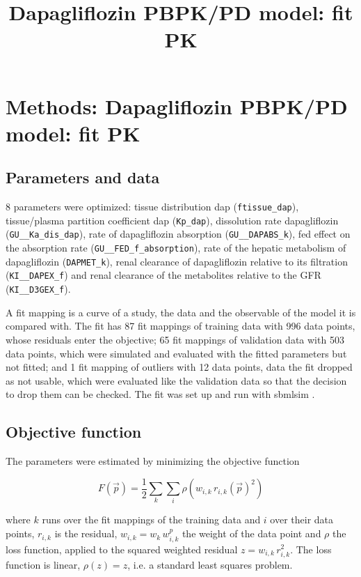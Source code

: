 \documentclass{article}
\title{Dapagliflozin PBPK/PD model: fit PK}
\date{}
\begin{document}
\maketitle

\section{Methods: Dapagliflozin PBPK/PD model: fit PK}

\subsection{Parameters and data}

8 parameters were optimized: tissue distribution dap (\texttt{ftissue\_dap}), tissue/plasma partition coefficient dap (\texttt{Kp\_dap}), dissolution rate dapagliflozin (\texttt{GU\_\_Ka\_dis\_dap}), rate of dapagliflozin absorption (\texttt{GU\_\_DAPABS\_k}), fed effect on the absorption rate (\texttt{GU\_\_FED\_f\_absorption}), rate of the hepatic metabolism of dapagliflozin (\texttt{DAPMET\_k}), renal clearance of dapagliflozin relative to its filtration (\texttt{KI\_\_DAPEX\_f}) and renal clearance of the metabolites relative to the GFR (\texttt{KI\_\_D3GEX\_f}).

A fit mapping is a curve of a study, the data and the observable of the model it is compared with. The fit has 87 fit mappings of training data with 996 data points, whose residuals enter the objective; 65 fit mappings of validation data with 503 data points, which were simulated and evaluated with the fitted parameters but not fitted; and 1 fit mapping of outliers with 12 data points, data the fit dropped as not usable, which were evaluated like the validation data so that the decision to drop them can be checked. The fit was set up and run with sbmlsim \cite{Koenig2026_sbmlsim}.

\subsection{Objective function}

The parameters were estimated by minimizing the objective function

\begin{equation}
F(\vec{p}) = \frac{1}{2} \sum_{k} \sum_{i} \rho\left(w_{i,k}\, r_{i,k}(\vec{p})^2\right)
\end{equation}

where $k$ runs over the fit mappings of the training data and $i$ over their data points, $r_{i,k}$ is the residual, $w_{i,k} = w_k\, w^{p}_{i,k}$ the weight of the data point and $\rho$ the loss function, applied to the squared weighted residual $z = w_{i,k}\, r_{i,k}^2$. The loss function is linear, $\rho(z) = z$, i.e. a standard least squares problem.
\end{document}
